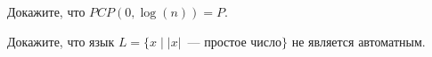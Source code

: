 \setcounter{curtask}{35}


\begin{task}
    Докажите, что $PCP(0, \log(n)) = P$.
\end{task}

\begin{task}
    Докажите, что язык $L = \{x \mid |x|$~--- простое число$\}$ не
    является автоматным.
\end{task}